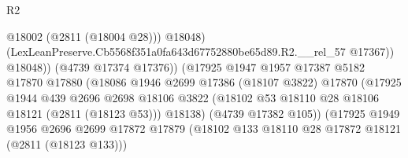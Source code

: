 \begin{lexlean}{R2}
\begin{coremodule}
                                                  @18002
                                                  (@2811 (@18004 @28)))
                                                @18048)
                                              (LexLeanPreserve.Cb5568f351a0fa643d67752880be65d89.R2.__rel_57
                                                @17367))
                                            @18048))
                                        (@4739 @17374 @17376))
                                      (@17925
                                        @1947
                                        @1957
                                        @17387
                                        @5182
                                        @17870
                                        @17880
                                        (@18086
                                          @1946
                                          @2699
                                          @17386
                                          (@18107 @3822)
                                          @17870
                                          (@17925
                                            @1944
                                            @439
                                            @2696
                                            @2698
                                            @18106
                                            @3822
                                            (@18102
                                              @53
                                              @18110
                                              @28
                                              @18106
                                              @18121
                                              (@2811 (@18123 @53)))
                                            @18138)
                                          (@4739 @17382 @105))
                                        (@17925
                                          @1949
                                          @1956
                                          @2696
                                          @2699
                                          @17872
                                          @17879
                                          (@18102
                                            @133
                                            @18110
                                            @28
                                            @17872
                                            @18121
                                            (@2811 (@18123 @133)))

\end{coremodule}
\end{lexlean}
